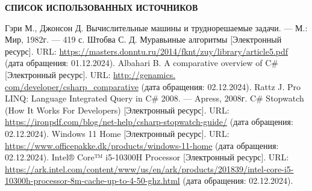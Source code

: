 \renewcommand{\bibname}{}
\begin{thebibliography}{6}
\renewcommand{\bibname}{СПИСОК ИСПОЛЬЗОВАННЫХ ИСТОЧНИКОВ}
\makeatletter
\renewcommand{\@biblabel}[1]{#1.}
\makeatother
\begin{center}
    \textbf{\bibname}
\end{center}
    Гэри М., Джонсон Д. Вычислительные машины и труднорешаемые задачи. --- М.: Мир, 1982г. --- 419 с.
	Штобва С. Д. Муравьиные алгоритмы [Электронный ресурс]. URL: \url{https://masters.donntu.ru/2014/fknt/zuy/library/article5.pdf} (дата обращения: 01.12.2024).
    Albahari B. A comparative overview of C# [Электронный ресурс]. URL: \url{http://genamics. com/developer/csharp_comparative} (дата обращения: 02.12.2024).
	Rattz J. Pro LINQ: Language Integrated Query in C# 2008. --- Apress, 2008г.
	C\# Stopwatch (How It Works For Developers) [Электронный ресурс]. URL: \url{https://ironpdf.com/blog/net-help/csharp-stopwatch-guide/} (дата обращения: 02.12.2024).
	Windows 11 Home [Электронный ресурс]. URL:
    \url{https://www.officepakke.dk/products/windows-11-home} (дата обращения: 02.12.2024).
	Intel® Core™ i5-10300H Processor [Электронный ресурс]. URL: \url{https://ark.intel.com/content/www/us/en/ark/products/201839/intel-core-i5-10300h-processor-8m-cache-up-to-4-50-ghz.html} (дата обращения: 02.12.2024).
\end{thebibliography}